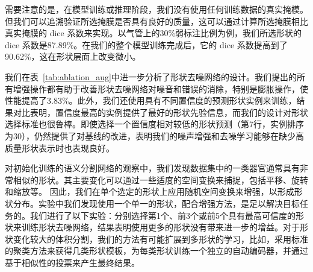 需要注意的是，在模型训练或推理阶段，我们没有使用任何训练数据的真实掩模。但我们可以追溯验证所选掩膜是否具有良好的质量，这可以通过计算所选掩膜相比真实掩膜的 dice 系数来实现。以气管上的30\%弱标注比例为例，我们所选形状的 dice 系数是87.89\%。在我们的整个模型训练完成后，它的 dice 系数提高到了 90.62\%，这在形状层面上改变微小。

我们在表~\ref{tab:ablation_aug}中进一步分析了形状去噪网络的设计。我们提出的所有增强操作都有助于改善形状去噪网络对噪音和错误的消除，特别是膨胀操作，使性能提高了3.83\%。此外，我们还使用具有不同置信度的预测形状实例来训练，结果对比表明，置信度最高的实例提供了最好的形状先验信息，而我们的设计对形状选择标准也很鲁棒。即使选择一个置信度相对较低的形状预测（第7行，实例排序为30），仍然提供了对基线的改进，表明我们的噪声增强和去噪学习能够在缺少高质量形状表示时也表现良好。

对初始化训练的语义分割网络的观察中，我们发现数据集中的一类器官通常具有非常相似的形状。其主要变化可以通过一些适度的空间变换来捕捉，包括平移、旋转和缩放等。
因此，我们在单个选定的形状上应用随机空间变换来增强，以形成形状分布。实验中我们发现使用一个单一的形状，配合增强方法，是足以解决目标任务的。我们进行了以下实验：分别选择第1个、前3个或前5个具有最高可信度的形状来训练形状去噪网络，结果表明使用更多的形状没有带来进一步的增益。对于形状变化较大的体积分割，我们的方法有可能扩展到多形状的学习，比如，采用标准的聚类方法来获得几类形状模板，为每类形状训练一个独立的自动编码器，并通过基于相似性的投票来产生最终结果。

